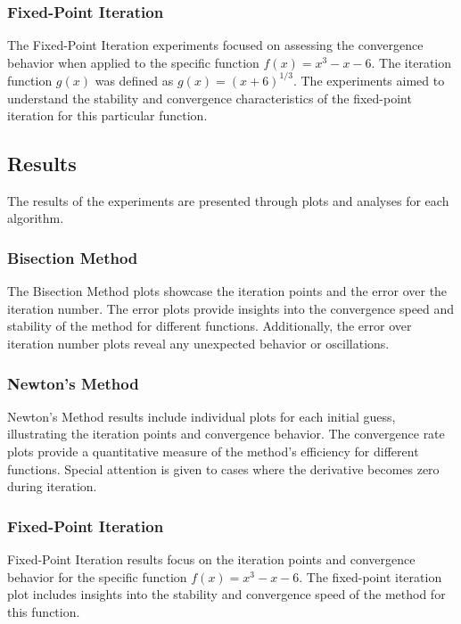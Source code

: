 \documentclass[12pt, letterpaper]{article}
\begin{document}
\subsubsection*{Fixed-Point Iteration}

The Fixed-Point Iteration experiments focused on assessing the convergence behavior when applied to the specific function \(f(x) = x^3 - x - 6\). The iteration function \(g(x)\) was defined as \(g(x) = (x + 6)^{1/3}\). The experiments aimed to understand the stability and convergence characteristics of the fixed-point iteration for this particular function.

\subsection*{Results}

The results of the experiments are presented through plots and analyses for each algorithm.

\subsubsection*{Bisection Method}

The Bisection Method plots showcase the iteration points and the error over the iteration number. The error plots provide insights into the convergence speed and stability of the method for different functions. Additionally, the error over iteration number plots reveal any unexpected behavior or oscillations.

\subsubsection*{Newton's Method}

Newton's Method results include individual plots for each initial guess, illustrating the iteration points and convergence behavior. The convergence rate plots provide a quantitative measure of the method's efficiency for different functions. Special attention is given to cases where the derivative becomes zero during iteration.

\subsubsection*{Fixed-Point Iteration}

Fixed-Point Iteration results focus on the iteration points and convergence behavior for the specific function \(f(x) = x^3 - x - 6\). The fixed-point iteration plot includes insights into the stability and convergence speed of the method for this function.
\end{document}
